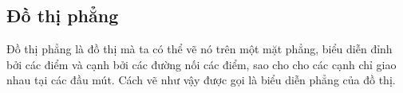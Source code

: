\subsection{Đồ thị phẳng}
\begin{definition}
    Đồ thị phẳng là đồ thị mà ta có thể vẽ nó trên một mặt phẳng, biểu diễn đỉnh bởi các điểm và cạnh bởi các đường nối các điểm, sao cho cho các cạnh chỉ giao nhau tại các đầu mút.
    Cách vẽ như vậy được gọi là biểu diễn phẳng của đồ thị.
\end{definition}

